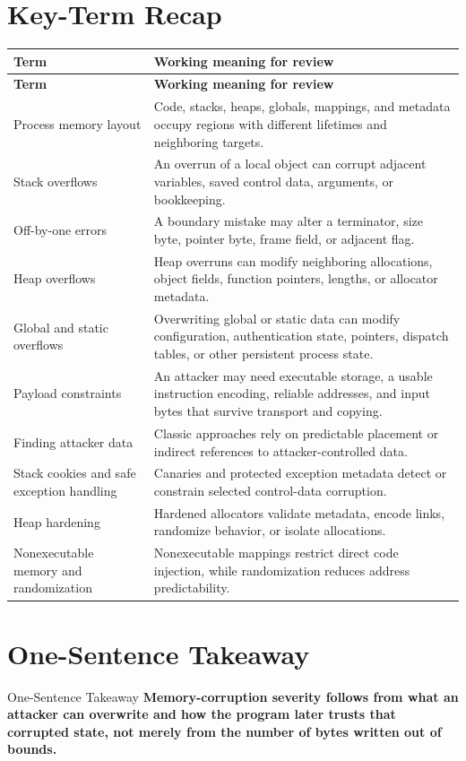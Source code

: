 \documentclass[11pt,letterpaper]{article}
\begin{document}
\section{Key-Term Recap}
\begin{longtable}{>{\raggedright\arraybackslash}p{}p{}}
\toprule
\textbf{Term} & \textbf{Working meaning for review} \\
\midrule
\endfirsthead
\toprule
\textbf{Term} & \textbf{Working meaning for review} \\
\midrule
\endhead
Process memory layout & Code, stacks, heaps, globals, mappings, and metadata occupy regions with different lifetimes and neighboring targets. \\
Stack overflows & An overrun of a local object can corrupt adjacent variables, saved control data, arguments, or bookkeeping. \\
Off-by-one errors & A boundary mistake may alter a terminator, size byte, pointer byte, frame field, or adjacent flag. \\
Heap overflows & Heap overruns can modify neighboring allocations, object fields, function pointers, lengths, or allocator metadata. \\
Global and static overflows & Overwriting global or static data can modify configuration, authentication state, pointers, dispatch tables, or other persistent process state. \\
Payload constraints & An attacker may need executable storage, a usable instruction encoding, reliable addresses, and input bytes that survive transport and copying. \\
Finding attacker data & Classic approaches rely on predictable placement or indirect references to attacker-controlled data. \\
Stack cookies and safe exception handling & Canaries and protected exception metadata detect or constrain selected control-data corruption. \\
Heap hardening & Hardened allocators validate metadata, encode links, randomize behavior, or isolate allocations. \\
Nonexecutable memory and randomization & Nonexecutable mappings restrict direct code injection, while randomization reduces address predictability. \\
\bottomrule
\end{longtable}
\section{One-Sentence Takeaway}
\begin{CornellExamBox}{One-Sentence Takeaway}
\textbf{Memory-corruption severity follows from what an attacker can overwrite and how the program later trusts that corrupted state, not merely from the number of bytes written out of bounds.}
\end{CornellExamBox}
\end{document}
